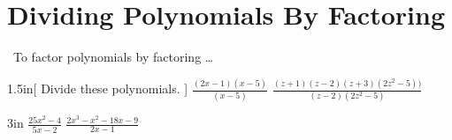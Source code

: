 \section{Dividing Polynomials By Factoring}

\begin{myConceptSteps}{~To factor polynomials by factoring \dots}
\end{myConceptSteps}

\begin{my2Problems}[\large]{1.5in}[
    Divide these polynomials.
    ]
    {
        $\frac{(2x-1)(x-5)}{(x-5)}$
    }
    {
        $\frac{(z+1)(z-2)(z+3)(2z^2-5))}{(z-2)(2z^2-5)}$
    }
\end{my2Problems}
\begin{my2Problems}[\large]{3in}
    {
        $\frac{25x^2-4}{5x-2}$
    }
    {
        $\frac{2x^3 - x^2 - 18x - 9}{2x-1}$
    }
\end{my2Problems}




